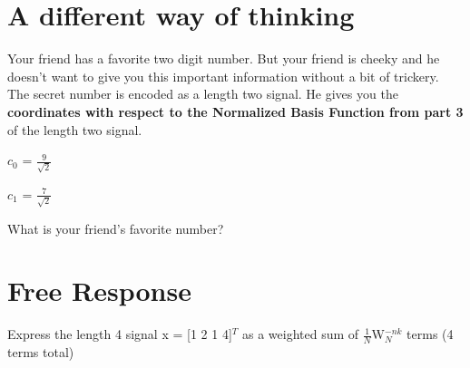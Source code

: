 \documentclass[11pt]{article}
\begin{document}
\newpage
\section{A different way of thinking}

Your friend has a favorite two digit number. But your friend is cheeky and he doesn't want to give you this important information without a bit of trickery. \newline
The secret number is encoded as a length two signal. He gives you the \textbf{coordinates with respect to the Normalized Basis Function from part 3} of the length two signal.

\begin{center}

$c_0$ = $\frac{9}{\sqrt{2}}$
\end{center}


\begin{center}

$c_1$ =  $\frac{7}{\sqrt{2}}$
\end{center}

What is your friend's favorite number?

\section{Free Response}

Express the length 4 signal x = [1 2 1 4]$^T$  as a weighted sum of $\frac{1}{N}$W$_N^{-nk}$ terms  (4 terms total)
\end{document}
